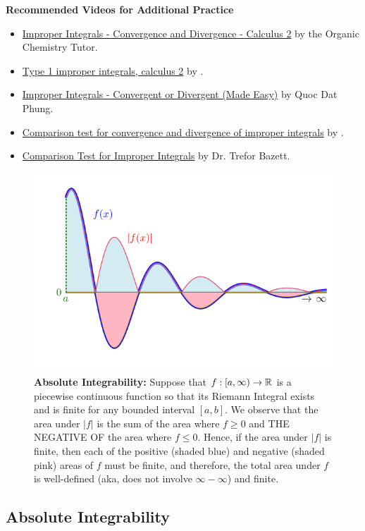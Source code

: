 \Qed

\bigskip
\textbf{Recommended Videos for Additional Practice}
\begin{itemize}
    \item \href{https://youtu.be/ND9cEdfCFr0}{Improper Integrals - Convergence and Divergence - Calculus 2} by the Organic Chemistry Tutor.
    \item \href{https://www.youtube.com/watch?v=45YcoKNRa-Y&t=59s}{Type 1 improper integrals, calculus 2} by \bprp.
    \item \href{https://youtu.be/yKq1bY3PDVA}{Improper Integrals - Convergent or Divergent (Made Easy)} by Quoc Dat Phung.
    \item \href{https://www.youtube.com/watch?v=4zjp39ga-QM}{Comparison test for convergence and divergence of improper integrals} by \bprp.
    \item \href{https://youtu.be/bkPR8wumPgQ}{Comparison Test for Improper Integrals} by Dr. Trefor Bazett.
\end{itemize}

\bigskip 

\begin{figure}[ht]%
\centering
\includegraphics[width=0.6\columnwidth]{graphics/Chap08/ComparisonTest02.png}
\vspace*{-.4cm}
    \caption[]{\textbf{Absolute Integrability:} Suppose that $f:[a, \infty) \to \mathbb R$ is a piecewise continuous function so that its Riemann Integral exists and is finite for any bounded interval $[a, b]$. We observe that the area under $|f|$ is the sum of the area where $f\ge 0$ and THE NEGATIVE OF the area where $f\le 0$. Hence, if the area under $|f|$ is finite, then each of the positive (shaded blue) and negative (shaded pink) areas of $f$ must be finite, and therefore, the total area under $f$ is well-defined (aka, does not involve $\infty - \infty$) and finite.}
    \label{fig:AbsolutelyInegrable}
\end{figure}

\subsection{Absolute Integrability}


